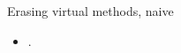 \begin{frame}{Erasing virtual methods, naive} 
    \begin{itemize}
        \item .
    \end{itemize}
\end{frame}
